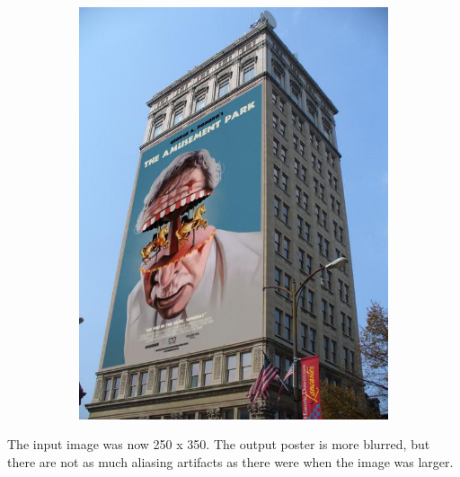 \documentclass{article}
\begin{document}
\begin{figure}[H]
\begin{subfigure}{.3\textwidth}
        \includegraphics[scale=0.5]{q2/output/output_small.jpg}
        \label{fig 1}
    \end{subfigure}
\end{figure}
The input image was now 250 x 350. The output poster is more blurred, but there are not as much aliasing artifacts as there were when the image 
was larger.  
\end{document}
